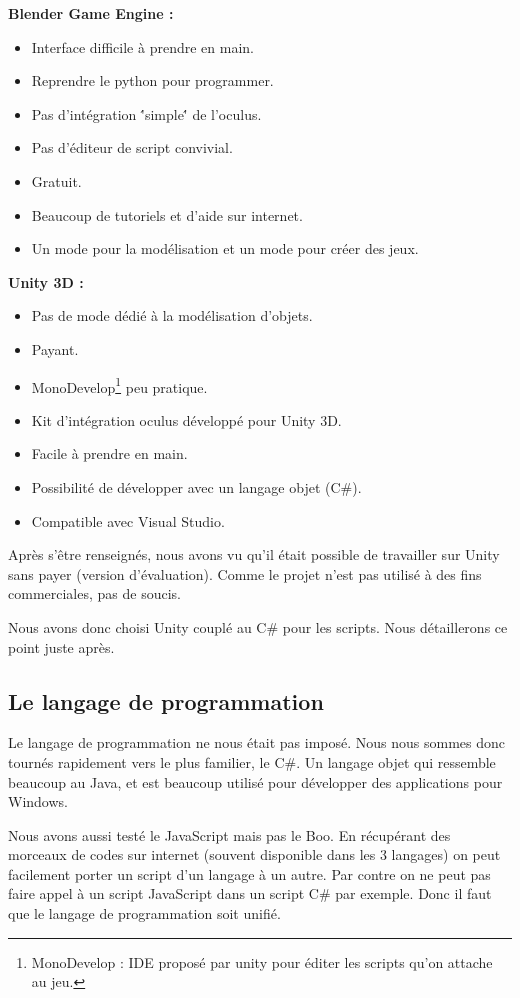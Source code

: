 \documentclass[a4paper,11pt]{myreport}
\begin{document}
  \begin{description}
  	\item \textbf{Blender Game Engine :}
  	\begin{itemize}
  		\item Interface difficile à prendre en main.
  		\item Reprendre le python pour programmer.
  		\item Pas d'intégration \''simple\'' de l'oculus.
  		\item Pas d'éditeur de script convivial.
  		\item Gratuit.
  		\item Beaucoup de tutoriels et d'aide sur internet.
  		\item Un mode pour la modélisation et un mode pour créer des jeux.
  	\end{itemize}
  	\item \textbf{Unity 3D :}
  		\begin{itemize}
  			\item Pas de mode dédié à la modélisation d'objets.
  			\item Payant.
  			\item MonoDevelop\footnote{MonoDevelop : IDE proposé par unity pour éditer les scripts qu'on attache au jeu.} peu pratique.
  			\item Kit d'intégration oculus développé pour Unity 3D.
  			\item Facile à prendre en main.
  			\item Possibilité de développer avec un langage objet (C\#).
  			\item Compatible avec Visual Studio.
  		\end{itemize}
  \end{description}
  
  \par Après s'être renseignés, nous avons vu qu'il était possible de travailler sur Unity sans payer (version d'évaluation). Comme le projet n'est pas utilisé à des fins commerciales, pas de soucis.
  \par Nous avons donc choisi Unity couplé au C\# pour les scripts. Nous détaillerons ce point juste après.
  
  \subsection{Le langage de programmation}
  \par Le langage de programmation ne nous était pas imposé. Nous nous sommes donc tournés rapidement vers le plus familier, le C\#. Un langage objet qui ressemble beaucoup au Java, et est beaucoup utilisé pour développer des applications pour Windows.
  \par Nous avons aussi testé le JavaScript mais pas le Boo. En récupérant des morceaux de codes sur internet (souvent disponible dans les 3 langages) on peut facilement porter un script d'un langage à un autre.
  Par contre on ne peut pas faire appel à un script JavaScript dans un script C\# par exemple. Donc il faut que le langage de programmation soit unifié.
\end{document}
